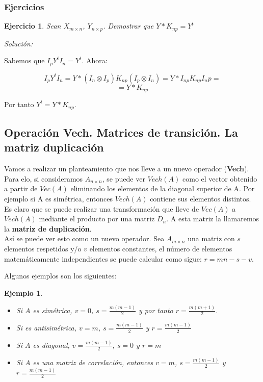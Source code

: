\documentclass{article}
\theoremstyle{theorem-style}  %
\theoremstyle{definition-style}
\theoremstyle{example-style}
\newtheorem{example}{Ejemplo}[section]
\theoremstyle{exercise-style}
\newtheorem{exercise}{Ejercicio}[section]
\begin{document}
	\subsubsection{Ejercicios}
	\begin{exercise}
		Sean $X_{m \times n}$, $Y_{n \times p}$. Demostrar que $Y*K_{np}=Y^t$
	\end{exercise}
	
	\textit{Solución:}
	
	Sabemos que $I_p Y^t I_n = Y^t$. Ahora:
	
	$$ I_p Y^t I_n = Y * (I_n \otimes I_p)K_{np}(I_p \otimes I_n) = Y*I_{np}K_{np}{I_np}= $$
	$$ = Y*K_{np}$$ 
	
	Por tanto $Y^t=Y*K_{np}$.
	
	
	\subsection{Operación Vech. Matrices de transición. La matriz duplicación}
	
	Vamos a realizar un planteamiento que nos lleve a un nuevo operador (\textbf{Vech}). Para elo, si consideramos $A_{n \times n}$, se puede ver $Vech(A)$ como el vector obtenido a partir de $Vec(A)$ eliminando los elementos de la diagonal superior de A. Por ejemplo si A es simétrica, entonces $Vech(A)$ contiene sus elementos distintos. \\
	
	Es claro que se puede realizar una transformación que lleve de $Vec(A)$ a $Vech(A)$ mediante el producto por una matriz $D_n$. A esta matriz la llamaremos la \textbf{matriz de duplicación}. \\
	
	Así se puede ver esto como un nuevo operador. Sea $A_{m \times n}$ una matriz con $s$ elementos respetidos y/o $v$ elementos constantes, el número de elementos matemáticamente independientes se puede calcular como sigue: $r=mn-s-v$.  
	
	Algunos ejemplos son los siguientes:
	
	\begin{example}	
		\begin{itemize}
			\item Si $A$ es simétrica, $v=0$, $s=\frac{m(m-1)}{2}$ y  por tanto $r=\frac{m(m+1)}{2}$.
			
			\item Si es antisimétrica, $v=m$, $s=\frac{m(m-1)}{2}$ y $r= \frac{m(m-1)}{2}$
			
			\item Si $A$ es diagonal, $v=\frac{m(m-1)}{2}$, $s=0$ y $r= m$ 
			
			\item Si $A$ es una matriz de correlación, entonces $v=m$, $s=\frac{m(m-1)}{2}$ y $r= \frac{m(m-1)}{2}$
		\end{itemize}
	\end{example}
	
\end{document}
